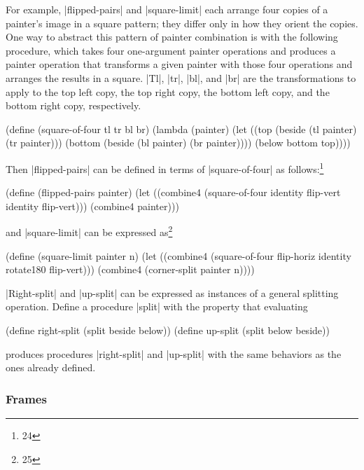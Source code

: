 \begin{Exercise}
\begin{Exercise}
\begin{Exercise}
\begin{Exercise}
For example, \scheme|flipped-pairs| and \scheme|square-limit| each
arrange four copies of a painter's image in a square pattern; they differ
only in how they orient the copies.
One way to abstract this pattern of painter combination is with
the following procedure, which takes four one-argument painter operations
and produces a painter operation that transforms a given
painter with those four operations and arranges the results in a square.
\scheme|Tl|, \scheme|tr|, \scheme|bl|, and \scheme|br| are the
transformations to apply to the top left copy, the top right copy,
the bottom left copy, and the bottom right copy, respectively.

\begin{schemedisplay}
(define (square-of-four tl tr bl br)
  (lambda (painter)
    (let ((top (beside (tl painter) (tr painter)))
          (bottom (beside (bl painter) (br painter))))
      (below bottom top))))
\end{schemedisplay}
Then \scheme|flipped-pairs| can be defined in terms
of \scheme|square-of-four| as follows:\footnote{24}

\begin{schemedisplay}
(define (flipped-pairs painter)
  (let ((combine4 (square-of-four identity flip-vert
                                  identity flip-vert)))
    (combine4 painter)))
\end{schemedisplay}
and \scheme|square-limit| can be expressed as\footnote{25}

\begin{schemedisplay}
(define (square-limit painter n)
  (let ((combine4 (square-of-four flip-horiz identity
                                  rotate180 flip-vert)))
    (combine4 (corner-split painter n))))
\end{schemedisplay}

\begin{Exercise}
\label{exc:2.45}
\scheme|Right-split| and \scheme|up-split| can be expressed as
instances of a general splitting operation.
Define a procedure \scheme|split| with the property that evaluating
\begin{schemedisplay}
(define right-split (split beside below))
(define up-split (split below beside))
\end{schemedisplay}
produces procedures \scheme|right-split| and \scheme|up-split| with the same
behaviors as the ones already defined.




\subsubsection*{Frames}



\end{Exercise}
\end{Exercise}
\end{Exercise}
\end{Exercise}
\end{Exercise}
